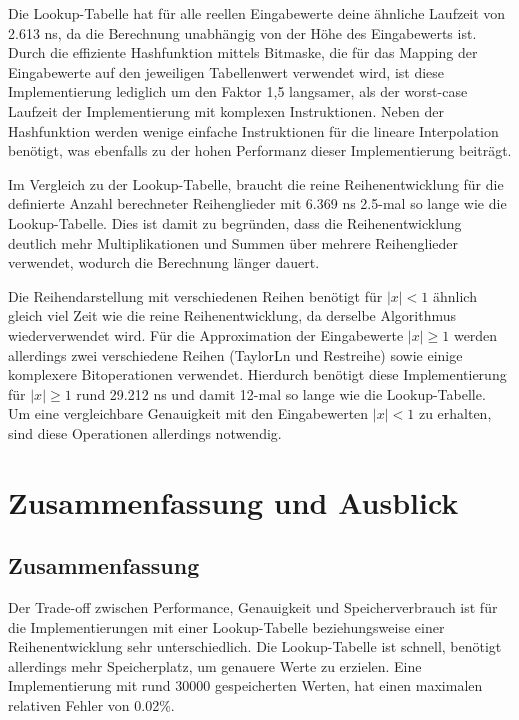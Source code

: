 \documentclass[course=erap] {aspdoc}
\begin{document}
    Die Lookup-Tabelle hat für alle reellen Eingabewerte deine ähnliche Laufzeit von 2.613 ns, da die Berechnung unabhängig von der Höhe des Eingabewerts ist.
    Durch die effiziente Hashfunktion mittels Bitmaske, die für das Mapping der Eingabewerte auf den jeweiligen Tabellenwert verwendet wird, ist diese Implementierung lediglich um den Faktor 1,5 langsamer, als der worst-case Laufzeit der Implementierung mit komplexen Instruktionen.
    Neben der Hashfunktion werden wenige einfache Instruktionen für die lineare Interpolation benötigt, was ebenfalls zu der hohen Performanz dieser Implementierung beiträgt.

    Im Vergleich zu der Lookup-Tabelle, braucht die reine Reihenentwicklung für die definierte Anzahl berechneter Reihenglieder mit 6.369 ns 2.5-mal so lange wie die Lookup-Tabelle.
    Dies ist damit zu begründen, dass die Reihenentwicklung deutlich mehr Multiplikationen und Summen über mehrere Reihenglieder verwendet, wodurch die Berechnung länger dauert.

    Die Reihendarstellung mit verschiedenen Reihen benötigt für $|x|<1$ ähnlich gleich viel Zeit wie die reine Reihenentwicklung, da derselbe Algorithmus wiederverwendet wird.
    Für die Approximation der Eingabewerte $|x|\geq1$ werden allerdings zwei verschiedene Reihen (TaylorLn und Restreihe) sowie einige komplexere Bitoperationen verwendet.
    Hierdurch benötigt diese Implementierung für $|x|\geq1$ rund 29.212 ns und damit 12-mal so lange wie die Lookup-Tabelle.
    Um eine vergleichbare Genauigkeit mit den Eingabewerten $|x|<1$ zu erhalten, sind diese Operationen allerdings notwendig.


    \section{Zusammenfassung und Ausblick}\label{sec:zusammenfassung-und-ausblick}

    \subsection{Zusammenfassung}\label{subsec:zusammenfassung}

    Der Trade-off zwischen Performance, Genauigkeit und Speicherverbrauch ist für die Implementierungen mit einer Lookup-Tabelle beziehungsweise einer Reihenentwicklung sehr unterschiedlich.
    Die Lookup-Tabelle ist schnell, benötigt allerdings mehr Speicherplatz, um genauere Werte zu erzielen.
    Eine Implementierung mit rund 30000 gespeicherten Werten, hat einen maximalen relativen Fehler von 0.02\%.
\end{document}
